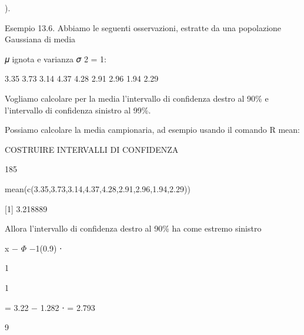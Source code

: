 \documentclass[a4paper,portrait,12pt]{article}
\begin{document}
).





\begin{flushleft}
Esempio 13.6. Abbiamo le seguenti osservazioni, estratte da una popolazione Gaussiana di media
\end{flushleft}


\begin{flushleft}
𝜇 ignota e varianza 𝜎 2 = 1:
\end{flushleft}


3.35 3.73 3.14 4.37 4.28 2.91 2.96 1.94 2.29


\begin{flushleft}
Vogliamo calcolare per la media l'intervallo di confidenza destro al 90\% e l'intervallo di confidenza sinistro al 99\%.
\end{flushleft}


\begin{flushleft}
Possiamo calcolare la media campionaria, ad esempio usando il comando R mean:
\end{flushleft}





\begin{flushleft}
 COSTRUIRE INTERVALLI DI CONFIDENZA
\end{flushleft}





185





\begin{flushleft}
mean(c(3.35,3.73,3.14,4.37,4.28,2.91,2.96,1.94,2.29))
\end{flushleft}


[1] 3.218889


\begin{flushleft}
Allora l'intervallo di confidenza destro al 90\% ha come estremo sinistro
\end{flushleft}


\begin{flushleft}
x $-$ $\Phi$ $-$1(0.9) ⋅
\end{flushleft}





1


1


= 3.22 $-$ 1.282 ⋅ = 2.793


9
\end{document}

